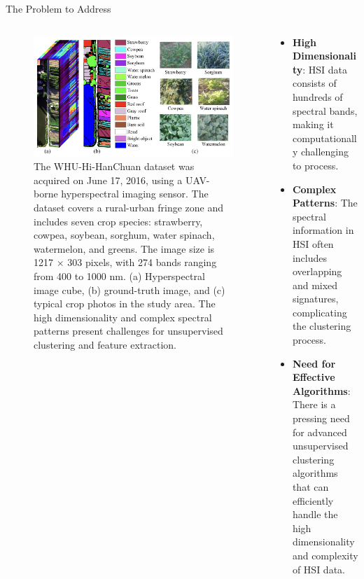 \documentclass[10pt,svgnames,fragile]{beamer}
\begin{document}
\begin{frame}{The Problem to Address}
    \begin{columns}
        \begin{column}{0.38\textwidth}
            \begin{figure}
            \centering
            \includegraphics[width=1\linewidth]{WHU-HI_HanChuan274.png}
            \caption{The WHU-Hi-HanChuan dataset was acquired on June 17, 2016, using a UAV-borne hyperspectral imaging sensor. The dataset covers a rural-urban fringe zone and includes seven crop species: strawberry, cowpea, soybean, sorghum, water spinach, watermelon, and greens. The image size is 1217 × 303 pixels, with 274 bands ranging from 400 to 1000 nm. (a) Hyperspectral image cube, (b) ground-truth image, and (c) typical crop photos in the study area. The high dimensionality and complex spectral patterns present challenges for unsupervised clustering and feature extraction.\cite{huWHUHiUAVborneHyperspectral}}
            \label{fig:whu-hi-hanchuan}
            \end{figure}
        \end{column}
        
        \begin{column}{0.62\textwidth}
            \begin{itemize}
                \item \small \textbf{High Dimensionality}: HSI data consists of hundreds of spectral bands, making it computationally challenging to process.
                \item \small \textbf{Complex Patterns}: The spectral information in HSI often includes overlapping and mixed signatures, complicating the clustering process.
                \item \small \textbf{Need for Effective Algorithms}: There is a pressing need for advanced unsupervised clustering algorithms that can efficiently handle the high dimensionality and complexity of HSI data.
            \end{itemize}
        \end{column}
    \end{columns}
\end{frame}
\end{document}
